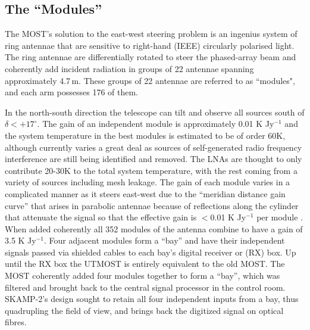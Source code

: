 \subsection{The ``Modules''}
The MOST's solution to the east-west steering problem is an ingenius system of ring antennae that are sensitive to right-hand (IEEE) circularly polarised light. The ring antennae are differentially rotated to steer the phased-array beam and coherently add incident radiation in groups of 22 antennae spanning approximately 4.7\,m. These groups of 22 antennae are referred to as ``modules", and each arm possesses 176 of them. 

In the north-south direction the telescope can tilt and observe all sources south of $\delta<+17^\circ$. The gain of an independent module is approximately 0.01 K Jy$^{-1}$ and the system temperature in the best modules is estimated to be of order 60K, although currently varies a great deal as sources of self-generated radio frequency interference are still being identified and removed. The LNAs are thought to only contribute 20-30K to the total system temperature, with the rest coming from a variety of sources including mesh leakage. The gain of each module varies in a complicated manner as it steers east-west due to the ``meridian distance gain curve'' that arises in parabolic antennae because of reflections along the cylinder that attenuate the signal so that the effective gain is $<$0.01 K Jy$^{-1}$ per module \cite{Hunstead_1996}. When added coherently all 352 modules of the antenna combine to have a gain of 3.5 K Jy$^{-1}$.
Four adjacent modules form a ``bay'' and have their independent signals passed via shielded cables to each bay's digital receiver or (RX) box. Up until the RX box the UTMOST is entirely equivalent to the old MOST. The MOST coherently added four modules together to form a ``bay'', which was filtered and brought back to the central signal processor in the control room. SKAMP-2's design sought to retain all four independent inputs from a bay, thus quadrupling the field of view, and brings back the digitized signal on optical fibres.